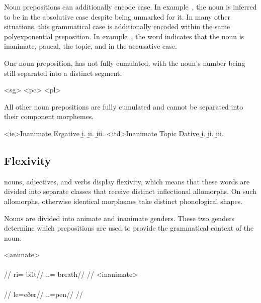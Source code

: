 Noun prepositions can additionally encode case. In example~, the noun   is inferred to be in the absolutive case despite being unmarked for it. In many other situations, this grammatical case is additionally encoded within the same polyexponential preposition. In example~, the word   indicates that the noun  is inanimate, paucal, the topic, and in the accusative case.

One noun preposition,   has not fully cumulated, with the noun's number being still separated into a distinct segment.

	\a<sg>   
	\a<pc>   
	\a<pl>   
\xe

All other noun prepositions are fully cumulated and cannot be separated into their component morphemes.

	\a<ie>Inanimate Ergative
	\beginsubsub
		\b{i.}   
		\b{ii.}   
		\b{iii.}   
	\endsubsub
	\a<itd>Inanimate Topic Dative
	\beginsubsub
		\b{i.}   
		\b{ii.}   
		\b{iii.}   
	\endsubsub
\xe


\subsection{Flexivity}
\label{subsec:tvk-flexivity}

\langtvk{} nouns, adjectives, and verbs display flexivity, which means that these words are divided into separate classes that receive distinct inflectional allomorphs. On such allomorphs, otherwise identical morphemes take distinct phonological shapes.

Nouns are divided into animate and inanimate genders. These two genders determine which prepositions are used to provide the grammatical context of the noun.

	\a<animate>\begingl
		\glpreamble{}\\
		\\
		//
		\gla ri= bilt//
		\glb \An.\Pc.\Abs= breath//
		\glft{}//
	\endgl
	\a<inanimate>\begingl
		\glpreamble{}\\
		\\
		//
		\gla le=eðer//
		\glb \In.\Pc.\Abs=pen//
		\glft{}//
	\endgl
\xe


